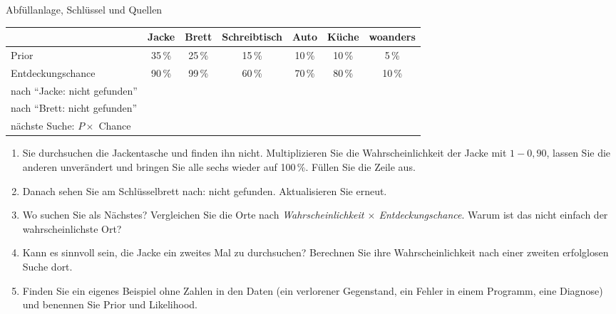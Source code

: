 \begin{uebungsblattc}{Abfüllanlage, Schlüssel und Quellen}
\begin{center}
\small
\renewcommand{\arraystretch}{1.7}
\begin{tabular}{@{}lcccccc@{}}
\toprule
 & \textbf{Jacke} & \textbf{Brett} & \textbf{Schreibtisch} & \textbf{Auto} & \textbf{Küche} & \textbf{woanders} \\
\midrule
Prior & 35\,\% & 25\,\% & 15\,\% & 10\,\% & 10\,\% & 5\,\% \\
Entdeckungschance & 90\,\% & 99\,\% & 60\,\% & 70\,\% & 80\,\% & 10\,\% \\
\midrule
nach \enquote{Jacke: nicht gefunden} & & & & & & \\
nach \enquote{Brett: nicht gefunden} & & & & & & \\
nächste Suche: $P\times$ Chance & & & & & & \\
\bottomrule
\end{tabular}
\end{center}
\begin{enumerate}
  \item Sie durchsuchen die Jackentasche und finden ihn nicht.
    Multiplizieren Sie die Wahrscheinlichkeit der Jacke mit $1-0{,}90$,
    lassen Sie die anderen unverändert und bringen Sie alle sechs wieder
    auf 100\,\%. Füllen Sie die Zeile aus.
  \item Danach sehen Sie am Schlüsselbrett nach: nicht gefunden.
    Aktualisieren Sie erneut.
  \item Wo suchen Sie als Nächstes? Vergleichen Sie die Orte nach
    \emph{Wahrscheinlichkeit $\times$ Entdeckungschance}. Warum ist das
    nicht einfach der wahrscheinlichste Ort?
  \item Kann es sinnvoll sein, die Jacke ein zweites Mal zu durchsuchen?
    Berechnen Sie ihre Wahrscheinlichkeit nach einer zweiten erfolglosen
    Suche dort.
  \item Finden Sie ein eigenes Beispiel ohne Zahlen in den Daten (ein
    verlorener Gegenstand, ein Fehler in einem Programm, eine Diagnose)
    und benennen Sie Prior und Likelihood.
\end{enumerate}


\end{uebungsblattc}
